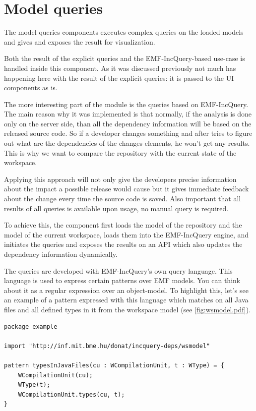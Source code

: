 \section{Model queries}
The model queries components executes complex queries on the loaded models and
gives and exposes the result for  visualization. 

Both the result of the explicit queries and the EMF-IncQuery-based use-case is
handled inside this component. As it was discussed previously not much has
happening here with the result of the explicit queries: it is passed to the UI
components as is.

The more interesting part of the module is the queries based on EMF-IncQuery.
The main reason why it was implemented is that normally, if the analysis is done
only on the server side, than all the dependency information will be based on
the released source code. So if a developer changes something and after tries to
figure out what are the dependencies of the changes elements, he won't get any
results. This is why we want to compare the repository with the current state of
the workspace.

Applying this approach will not only give the developers precise information
about the impact a possible release would cause but it gives immediate feedback
about the change every time the source code is saved. Also important that
all results of all queries is available upon usage, no manual query is required.

To achieve this, the component first loads the model of the repository and the 
model of the current workspace, loads them into the EMF-IncQuery engine, 
and initiates the queries and exposes the results on an API which also updates
the dependency information dynamically. 
 
The queries are developed with EMF-IncQuery's own query language. This language
is used to express certain patterns over EMF models. You can think about it as 
a regular expression over an object-model. To highlight this, let's see an example
of a pattern expressed with this language which matches on all Java files and
all defined types in it from the workspace model (see \autoref{fig:wsmodel.pdf}). 
\begin{lstlisting}
package example

import "http://inf.mit.bme.hu/donat/incquery-deps/wsmodel"

pattern typesInJavaFiles(cu : WCompilationUnit, t : WType) = {
	WCompilationUnit(cu);
	WType(t);
	WCompilationUnit.types(cu, t);
}
\end{lstlisting}

